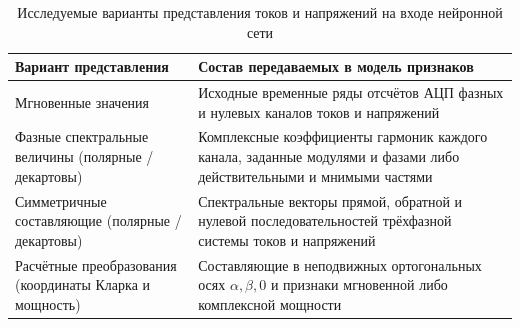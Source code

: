 \begin{table}[htbp]
\centering\small
\caption{Исследуемые варианты представления токов и напряжений на входе нейронной сети}
\label{tab:ch4_input_representations}
\renewcommand{\arraystretch}{1.25}
\begin{tabularx}{\textwidth}{@{}>{\raggedright\arraybackslash}p{}>{\raggedright\arraybackslash}X@{}}
\toprule
Вариант представления & Состав передаваемых в модель признаков \\
\midrule
Мгновенные значения & Исходные временные ряды отсчётов АЦП фазных и нулевых каналов токов и напряжений \\
\addlinespace[4pt]
Фазные спектральные величины (полярные / декартовы) & Комплексные коэффициенты гармоник каждого канала, заданные модулями и фазами либо действительными и мнимыми частями \\
\addlinespace[4pt]
Симметричные составляющие (полярные / декартовы) & Спектральные векторы прямой, обратной и нулевой последовательностей трёхфазной системы токов и напряжений \\
\addlinespace[4pt]
Расчётные преобразования (координаты Кларка и мощность) & Составляющие в неподвижных ортогональных осях $\alpha, \beta, 0$ и признаки мгновенной либо комплексной мощности \\
\bottomrule
\end{tabularx}
\end{table}


